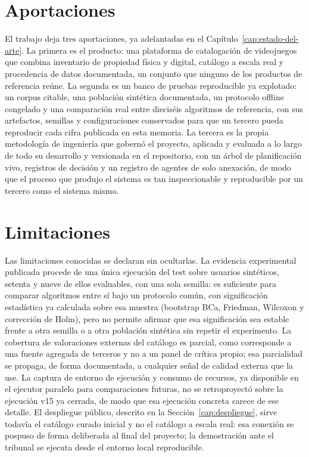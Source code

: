 \section{Aportaciones}\label{sec:conc-aportaciones}

El trabajo deja tres aportaciones, ya adelantadas en el Capítulo~\ref{cap:estado-del-arte}. La
primera es el producto: una plataforma de catalogación de videojuegos que combina inventario
de propiedad física y digital, catálogo a escala real y procedencia de datos documentada, un
conjunto que ninguno de los productos de referencia reúne. La segunda es un banco de pruebas
reproducible ya explotado: un corpus citable, una población sintética documentada, un
protocolo offline congelado y una comparación real entre dieciséis algoritmos de referencia,
con sus artefactos, semillas y configuraciones conservados para que un tercero pueda
reproducir cada cifra publicada en esta memoria. La tercera es la propia metodología de
ingeniería que gobernó el proyecto, aplicada y evaluada a lo largo de todo su desarrollo y
versionada en el repositorio, con un árbol de planificación vivo, registros de decisión y un
registro de agentes de solo anexación, de modo que el proceso que produjo el sistema es tan
inspeccionable y reproducible por un tercero como el sistema mismo.

\section{Limitaciones}\label{sec:conc-limitaciones}

Las limitaciones conocidas se declaran sin ocultarlas. La evidencia experimental publicada
procede de una única ejecución del test sobre usuarios sintéticos, setenta y nueve de ellos
evaluables, con una sola semilla: es suficiente para comparar algoritmos entre sí bajo un
protocolo común, con significación estadística ya calculada sobre esa muestra (bootstrap BCa,
Friedman, Wilcoxon y corrección de Holm), pero no permite afirmar que esa significación sea
estable frente a otra semilla o a otra población sintética sin repetir el experimento. La
cobertura de valoraciones externas del catálogo es parcial, como corresponde a una fuente
agregada de terceros y no a un panel de crítica propio; esa parcialidad se propaga, de forma
documentada, a cualquier señal de calidad externa que la use. La captura de entorno de
ejecución y consumo de recursos, ya disponible en el ejecutor paralelo para comparaciones
futuras, no se retroproyectó sobre la ejecución v15 ya cerrada, de modo que esa ejecución
concreta carece de ese detalle. El despliegue público, descrito en la
Sección~\ref{cap:despliegue}, sirve todavía el catálogo curado inicial y no el catálogo a
escala real: esa conexión se pospuso de forma deliberada al final del proyecto; la
demostración ante el tribunal se ejecuta desde el entorno local reproducible.

